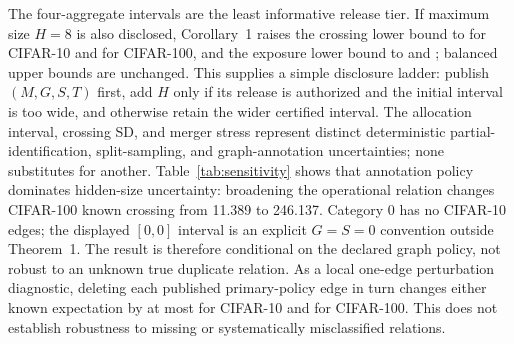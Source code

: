 \documentclass[conference,10pt]{IEEEtran}
\begin{document}
The four-aggregate intervals are the least informative release tier. If maximum size $H=8$ is also disclosed, Corollary~1 raises the crossing lower bound to \CifarTenCapCrossMin{} for CIFAR-10 and \CifarHundredCapCrossMin{} for CIFAR-100, and the exposure lower bound to \CifarTenCapExposedMin{} and \CifarHundredCapExposedMin{}; balanced upper bounds are unchanged. This supplies a simple disclosure ladder: publish $(M,G,S,T)$ first, add $H$ only if its release is authorized and the initial interval is too wide, and otherwise retain the wider certified interval. The allocation interval, crossing SD, and merger stress represent distinct deterministic partial-identification, split-sampling, and graph-annotation uncertainties; none substitutes for another.
Table~\ref{tab:sensitivity} shows that annotation policy dominates hidden-size uncertainty: broadening the operational relation changes CIFAR-100 known crossing from 11.389 to 246.137. Category 0 has no CIFAR-10 edges; the displayed $[0,0]$ interval is an explicit $G=S=0$ convention outside Theorem~1. The result is therefore conditional on the declared graph policy, not robust to an unknown true duplicate relation. As a local one-edge perturbation diagnostic, deleting each published primary-policy edge in turn changes either known expectation by at most \CifarTenEdgeDeletionMaxCross{} for CIFAR-10 and \CifarHundredEdgeDeletionMaxCross{} for CIFAR-100. This does not establish robustness to missing or systematically misclassified relations.
\end{document}
